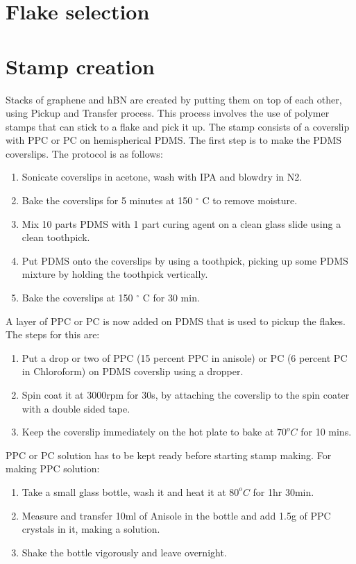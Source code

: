 \section{Flake selection}
\section{Stamp creation}

Stacks of graphene and hBN are created by putting them on top of each other, using Pickup and Transfer process. This process involves the use of polymer stamps that can stick to a flake and pick it up. The stamp consists of a coverslip with PPC or PC on hemispherical PDMS. The first step is to make the PDMS coverslips. The protocol is as follows:
\begin{enumerate}
\item Sonicate coverslips in acetone, wash with IPA and blowdry in N2.
\item Bake the coverslips for 5 minutes at 150 $^{\circ}$ C to remove moisture.
\item Mix 10 parts PDMS with 1 part curing agent on a clean glass slide using a clean toothpick.
\item Put PDMS onto the coverslips by using a toothpick, picking up some PDMS mixture by holding the toothpick vertically.
\item Bake the coverslips at 150 $^{\circ}$ C for 30 min.
\end{enumerate}
A layer of PPC or PC is now added on PDMS that is used to pickup the flakes. The steps for this are:
\begin{enumerate}
\item Put a drop or two of PPC (15 percent PPC in anisole) or PC (6 percent PC in Chloroform) on PDMS coverslip using a dropper.
\item Spin coat it at 3000rpm for 30s, by attaching the coverslip to the spin coater with a double sided tape.
\item Keep the coverslip immediately on the hot plate to bake at $70 ^o C$ for 10 mins.
\end{enumerate}
PPC or PC solution has to be kept ready before starting stamp making. For making PPC solution: 
\begin{enumerate}
\item Take a small glass bottle, wash it and heat it at $80 ^o C$ for 1hr 30min. \item Measure and transfer 10ml of Anisole in the bottle and add 1.5g of PPC crystals in it, making a solution.
\item Shake the bottle vigorously and leave overnight.
\end{enumerate}
